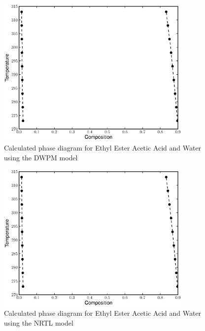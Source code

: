 \begin{figure}[hp]
\centering
\includegraphics[width = 0.85\textwidth]{Results_Parts/BinaryParams/ethylesteraceticacid-water/DWPM/PhaseDiagram.eps}
\caption{Calculated phase diagram for Ethyl Ester Acetic Acid and Water using the DWPM model} \label{DWPMethylesteraceticacid-water}
\end{figure}

\begin{figure}[hp]
\centering
\includegraphics[width = 0.85\textwidth]{Results_Parts/BinaryParams/ethylesteraceticacid-water/NRTL/PhaseDiagram.eps}
\caption{Calculated phase diagram for Ethyl Ester Acetic Acid and Water using the NRTL model} \label{NRTLethylesteraceticacid-water}
\end{figure}	

